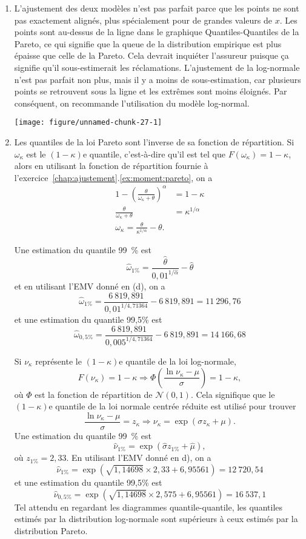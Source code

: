 \begin{solution}{4.16}
\begin{enumerate}
\item L'ajustement des deux modèles n'est pas parfait parce que les points ne sont pas exactement alignés, plus spécialement pour de grandes valeurs de $x$. Les points sont au-dessus de la ligne dans le graphique Quantiles-Quantiles de la Pareto, ce qui signifie que la queue de la distribution empirique est plus épaisse que celle de la Pareto. Cela devrait inquiéter l'assureur puisque ça signifie qu'il sous-estimerait les réclamations. L'ajustement de la log-normale n'est pas parfait non plus, mais il y a moins de sous-estimation, car plusieurs points se retrouvent sous la ligne et les extrêmes sont moins éloignés. Par conséquent, on recommande l'utilisation du modèle log-normal.

\begin{knitrout}
\color{fgcolor}
\texttt{[image: figure/unnamed-chunk-27-1]}

\end{knitrout}

\item Les quantiles de la loi Pareto sont l'inverse de sa fonction de répartition. Si $\omega_\kappa$ est le $(1-\kappa)$e quantile, c'est-à-dire qu'il est tel que $F(\omega_\kappa)=1-\kappa$, alors en utilisant la fonction de répartition fournie à l'exercice~\ref{chap:ajustement}.\ref{ex:moment:pareto}, on a
\begin{align*}
1-\left(\frac{\theta}{\omega_\kappa+\theta}\right)^\alpha &= 1-\kappa\\
\frac{\theta}{\omega_\kappa+\theta} &= \kappa^{1/\alpha}\\
\omega_\kappa= \frac{\theta}{\kappa^{1/\alpha}}-\theta.
\end{align*}

Une estimation du quantile 99~\% est
$$
\hat\omega_{1\%}= \frac{\hat\theta}{0,01^{1/\hat\alpha}}-\hat\theta
$$
et en utilisant l'EMV donné en (d), on a
$$
\hat\omega_{1\%}= \frac{6~819,891}{0,01^{1/ 4,71364}}-6~819,891=11~296,76
$$
et une estimation du quantile 99,5\% est
$$
\hat\omega_{0,5\%}= \frac{6~819,891}{0,005^{1/4,71364}}-6~819,891= 14~166,68
$$

Si $\nu_\kappa$ représente le $(1-\kappa)$e quantile de la loi log-normale,
$$
F(\nu_\kappa)=1-\kappa \Rightarrow \Phi\left(\frac{\ln\nu_\kappa-\mu}{\sigma}\right)=1-\kappa,
$$
où $\Phi$ est la fonction de répartition de $\mathcal{N}(0,1)$. Cela signifique que le $(1-\kappa)$e quantile de la loi normale centrée réduite est utilisé pour trouver
$$
\frac{\ln\nu_\kappa-\mu}{\sigma}=z_\kappa \Rightarrow \nu_\kappa = \exp(\sigma z_\kappa+\mu).
$$
Une estimation du quantile 99~\% est
$$
\hat\nu_{1\%}= \exp(\hat\sigma z_{1\%}+\hat\mu),
$$
où $z_{1\%}=2,33$. En utilisant l'EMV donné en d), on a
$$
\hat\nu_{1\%}= \exp(\sqrt{1,14698}\times 2,33+6,95561)=12~720,54
$$
et une estimation du quantile 99,5\% est
$$
\hat\nu_{0,5\%}= \exp(\sqrt{1,14698}\times 2,575+6,95561)=16~537,1
$$
Tel attendu en regardant les diagrammes quantile-quantile, les quantiles estimés par la distribution log-normale sont supérieurs à ceux estimés par la distribution Pareto.
\end{enumerate}


\end{solution}
